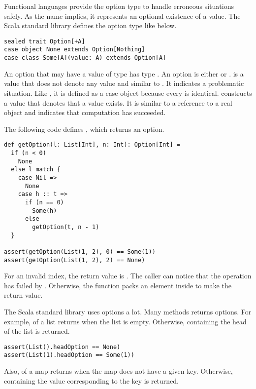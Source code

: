 Functional languages provide the option type to handle erroneous situations
safely. As the name implies, it represents an optional existence of a value.
The Scala standard library defines the option type like below.

\begin{verbatim}
sealed trait Option[+A]
case object None extends Option[Nothing]
case class Some[A](value: A) extends Option[A]
\end{verbatim}

An option that may have a value of type  has type .
An option is either  or .
 is a value that does not denote any value and similar
to . It indicates a problematic situation. Like , it is
defined as a case object because every  is identical.  constructs a value that
denotes that a value exists. It is similar to a reference to a real object and
indicates that computation has succeeded.

The following code defines , which returns an option.

\begin{verbatim}
def getOption(l: List[Int], n: Int): Option[Int] =
  if (n < 0)
    None
  else l match {
    case Nil =>
      None
    case h :: t =>
      if (n == 0)
        Some(h)
      else
        getOption(t, n - 1)
  }

assert(getOption(List(1, 2), 0) == Some(1))
assert(getOption(List(1, 2), 2) == None)
\end{verbatim}

For an invalid index, the return value is . The caller can notice
that the operation has failed by .
Otherwise, the function packs
an element inside  to make the return value.

The Scala standard library uses options a lot. Many methods returns options.
For example,  of a list returns  when the list is
empty. Otherwise,  containing the head of the list is returned.

\begin{verbatim}
assert(List().headOption == None)
assert(List(1).headOption == Some(1))
\end{verbatim}

Also,  of a map returns  when the map does not have a given key.
Otherwise,  containing the value corresponding to the key is
returned.

